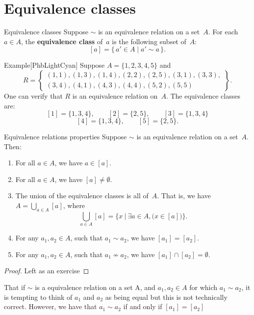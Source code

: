 \documentclass[../MATH-2000-Notes.tex]{subfiles}
\begin{document}
\section{Equivalence classes}
\begin{Definition}
    {Equivalence classes}
    Suppose $\sim$ is an equivalence relation on a set~$A$. For each $a \in A$, the \textbf{equivalence class} of~$a$ is the following subset of~$A$:
    $$ [a] = \{\, a' \in A \mid a' \sim a \,\}
        .$$
\end{Definition}
\begin{commentbox}{Example}[{PhbLightCyan}]\label{EquivClassEg}
    Suppose $A = \{1,2,3,4,5\}$ and
    $$R = \left\{ \begin{matrix} (1,1), (1,3), (1,4), (2,2), (2,5), (3,1), (3,3), \\
            (3,4), (4,1), (4,3), (4,4), (5,2), (5,5)
        \end{matrix}
        \right\} .$$
    One can verify that $R$ is an equivalence relation on~$A$. The equivalence classes are:
    $$ [1] = \{1,3,4\},
        \qquad [2] = \{2,5\} ,
        \qquad [3] = \{1,3,4\}
    $$
    $$[4] = \{1,3,4\} ,
        \qquad [5] = \{2,5\} .$$
\end{commentbox}
\begin{Theorem}
    {Equivalence relations properties}\label{EquivRelProps}
    Suppose $\sim$ is an equivalence relation on a set~$A$. Then:
    \begin{enumerate}
        \item \label{EquivRelProps-aIn[a]}
              For all $a \in A$, we have $a \in [a]$.
        \item \label{EquivRelProps-nonempty}
              For all $a \in A$, we have $[a] \neq \emptyset$.
        \item \label{EquivRelProps-union}
              The union of the equivalence classes is all of~$A$. That is, we have $A = \bigcup_{a \in A} [a]$, where
              $$ \bigcup_{a \in A} [a] = \{ x\ |\ \exists a \in A, \bigl(x \in [a] \bigr)\} .$$
        \item \label{EquivRelProps-equal}
              For any $a_1,a_2 \in A$, such that $a_1 \sim a_2$, we have $[a_1] = [a_2]$.
        \item \label{EquivRelProps-disjoint}
              For any $a_1,a_2 \in A$, such that $a_1 \not\sim a_2$, we have $[a_1] \cap [a_2] = \emptyset$.
    \end{enumerate}
\end{Theorem}
\begin{proof}
    Left as an exercise
\end{proof}
\begin{Note}
    That if \(\sim\) is a equivalence relation on a set A, and \(a_1,a_2 \in A\) for which \(a_1 \sim a_2\), it is tempting to think of \(a_1\) and \(a_2\) as being equal but this is not technically correct. However, we have that \(a_1 \sim a_2\) if and only if \([a_1] = [a_2]\)
\end{Note}
\newpage
\end{document}
